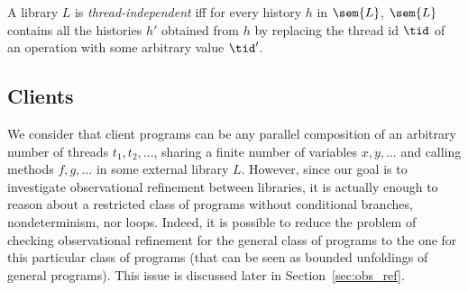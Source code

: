 \begin{definition}
A library $L$ is \emph{thread-independent} iff for every history $h$ in $\sem{L}$, $\sem{L}$ contains all the histories $h'$ obtained 
from $h$ by replacing the thread id $\tid$ of an operation with some arbitrary value $\tid'$.
\end{definition}

\subsection{Clients}

We consider that client programs can be any parallel composition of an arbitrary number of threads $t_1, t_2, ...$, sharing a finite number of variables $x, y, ...$ and calling methods $f, g, ...$ in some external library $L$. 
%
However, since our goal is to investigate observational refinement  between libraries, it is actually enough to reason about a restricted class of programs without conditional branches, nondeterminism, nor loops. Indeed, it is possible to reduce the problem of checking observational refinement for the general class of programs to the one for this particular class of programs (that can be seen as bounded unfoldings of general programs). This issue is discussed later in Section~\ref{sec:obs_ref}.

